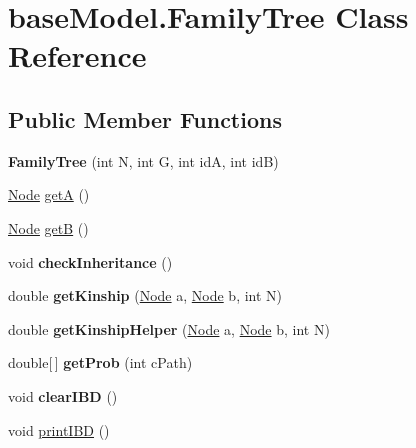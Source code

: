 \hypertarget{classbase_model_1_1_family_tree}{}\section{base\+Model.\+Family\+Tree Class Reference}
\label{classbase_model_1_1_family_tree}
\subsection*{Public Member Functions}
\begin{DoxyCompactItemize}
\item 
\hypertarget{classbase_model_1_1_family_tree_aa944201c4619a3703a26c1c302450082}{}{\bfseries Family\+Tree} (int N, int G, int id\+A, int id\+B)\label{classbase_model_1_1_family_tree_aa944201c4619a3703a26c1c302450082}

\item 
\hyperlink{classbase_model_1_1_node}{Node} \hyperlink{classbase_model_1_1_family_tree_a470eb923e2b6a296b923f0f74fbd00f0}{get\+A} ()
\item 
\hyperlink{classbase_model_1_1_node}{Node} \hyperlink{classbase_model_1_1_family_tree_ab1ce7b12ed9e57b96c843a2db508d0f0}{get\+B} ()
\item 
\hypertarget{classbase_model_1_1_family_tree_a54857e767b9470030c17c7d160992b81}{}void {\bfseries check\+Inheritance} ()\label{classbase_model_1_1_family_tree_a54857e767b9470030c17c7d160992b81}

\item 
\hypertarget{classbase_model_1_1_family_tree_a98a4faf03f4c8e49ad80e14d25abd3c7}{}double {\bfseries get\+Kinship} (\hyperlink{classbase_model_1_1_node}{Node} a, \hyperlink{classbase_model_1_1_node}{Node} b, int N)\label{classbase_model_1_1_family_tree_a98a4faf03f4c8e49ad80e14d25abd3c7}

\item 
\hypertarget{classbase_model_1_1_family_tree_aaba5d8fa389236bfec4ddd0031a92a43}{}double {\bfseries get\+Kinship\+Helper} (\hyperlink{classbase_model_1_1_node}{Node} a, \hyperlink{classbase_model_1_1_node}{Node} b, int N)\label{classbase_model_1_1_family_tree_aaba5d8fa389236bfec4ddd0031a92a43}

\item 
\hypertarget{classbase_model_1_1_family_tree_af8d2013dc830bbd4dabedb45800ff786}{}double\mbox{[}$\,$\mbox{]} {\bfseries get\+Prob} (int c\+Path)\label{classbase_model_1_1_family_tree_af8d2013dc830bbd4dabedb45800ff786}

\item 
\hypertarget{classbase_model_1_1_family_tree_a6b6313e4f0c388b78929c49b9b40e8cc}{}void {\bfseries clear\+I\+B\+D} ()\label{classbase_model_1_1_family_tree_a6b6313e4f0c388b78929c49b9b40e8cc}

\item 
void \hyperlink{classbase_model_1_1_family_tree_abe18dc75f2010029b57ab086b062343e}{print\+I\+B\+D} ()
\end{DoxyCompactItemize}


